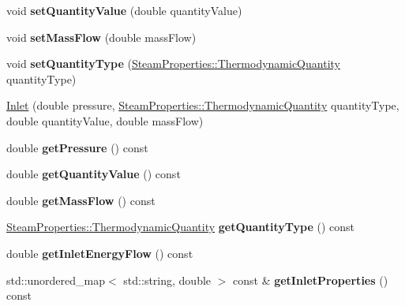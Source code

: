 \begin{DoxyCompactItemize}
\item 
\mbox{\label{class_inlet_a64a5567c35c89f82f5782bf7b83b90c3}} 
void {\bfseries set\+Quantity\+Value} (double quantity\+Value)
\item 
\mbox{\label{class_inlet_a1e427ac34eeebf46546ed53499359459}} 
void {\bfseries set\+Mass\+Flow} (double mass\+Flow)
\item 
\mbox{\label{class_inlet_a4171632101de3f4c97c93bb06c6b51e4}} 
void {\bfseries set\+Quantity\+Type} (\hyperlink{class_steam_properties_ae0294bedf7d178c2d8fb6aed0f62fbff}{Steam\+Properties\+::\+Thermodynamic\+Quantity} quantity\+Type)
\item 
\hyperlink{class_inlet_a1b0e1d27b8c7b11cfd96623b1c0b8a9e}{Inlet} (double pressure, \hyperlink{class_steam_properties_ae0294bedf7d178c2d8fb6aed0f62fbff}{Steam\+Properties\+::\+Thermodynamic\+Quantity} quantity\+Type, double quantity\+Value, double mass\+Flow)
\item 
\mbox{\label{class_inlet_af9bc455eb1287892901b7d090dabddfd}} 
double {\bfseries get\+Pressure} () const
\item 
\mbox{\label{class_inlet_ac9279e9c81b989b795351f09c4dd2b71}} 
double {\bfseries get\+Quantity\+Value} () const
\item 
\mbox{\label{class_inlet_af32941228d08175cb13d6f7757de39aa}} 
double {\bfseries get\+Mass\+Flow} () const
\item 
\mbox{\label{class_inlet_a3ed1699b174d0698af937c7146bbee79}} 
\hyperlink{class_steam_properties_ae0294bedf7d178c2d8fb6aed0f62fbff}{Steam\+Properties\+::\+Thermodynamic\+Quantity} {\bfseries get\+Quantity\+Type} () const
\item 
\mbox{\label{class_inlet_a870b939e6b0de093a42341e3fa22d75b}} 
double {\bfseries get\+Inlet\+Energy\+Flow} () const
\item 
\mbox{\label{class_inlet_a3c80c1f4bd8ef59b557c789f4b86960f}} 
std\+::unordered\+\_\+map$<$ std\+::string, double $>$ const  \& {\bfseries get\+Inlet\+Properties} () const
\item 

\end{DoxyCompactItemize}
